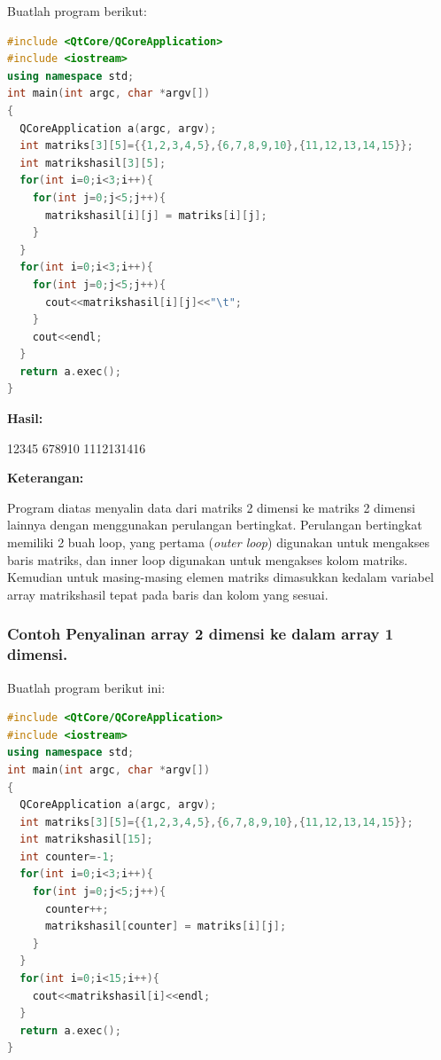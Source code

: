 Buatlah program berikut:

\begin{lstlisting}[language=c++, caption=Penyalinan Array 2 Dimensi ke Array 2 Dimensi lainnya, label=contoh3-11]
#include <QtCore/QCoreApplication>
#include <iostream>
using namespace std;
int main(int argc, char *argv[])
{
  QCoreApplication a(argc, argv);
  int matriks[3][5]={{1,2,3,4,5},{6,7,8,9,10},{11,12,13,14,15}};
  int matrikshasil[3][5];
  for(int i=0;i<3;i++){
    for(int j=0;j<5;j++){
      matrikshasil[i][j] = matriks[i][j];
    }
  }
  for(int i=0;i<3;i++){
    for(int j=0;j<5;j++){
      cout<<matrikshasil[i][j]<<"\t";
    }
    cout<<endl;
  }
  return a.exec();
}
\end{lstlisting}

\textbf{Hasil:}

\begin{lcverbatim}
12345
678910
1112131416
\end{lcverbatim}

\textbf{Keterangan:}

Program diatas menyalin data dari matriks 2 dimensi ke matriks 2 dimensi
lainnya dengan menggunakan perulangan bertingkat. Perulangan bertingkat
memiliki 2 buah loop, yang pertama (\emph{outer loop}) digunakan untuk
mengakses baris matriks, dan inner loop digunakan untuk mengakses kolom
matriks. Kemudian untuk masing-masing elemen matriks dimasukkan kedalam
variabel array matrikshasil tepat pada baris dan kolom yang sesuai.

\subsubsection*{Contoh  Penyalinan array 2 dimensi ke dalam array 1 dimensi.}

Buatlah program berikut ini:

\begin{lstlisting}[language=c++, caption=Penyalinan array 2 dimensi ke dalam array 1 dimensi, label=contoh3-12]
#include <QtCore/QCoreApplication>
#include <iostream>
using namespace std;
int main(int argc, char *argv[])
{
  QCoreApplication a(argc, argv);
  int matriks[3][5]={{1,2,3,4,5},{6,7,8,9,10},{11,12,13,14,15}};
  int matrikshasil[15];
  int counter=-1;
  for(int i=0;i<3;i++){
    for(int j=0;j<5;j++){
      counter++;
      matrikshasil[counter] = matriks[i][j];
    }
  }
  for(int i=0;i<15;i++){
    cout<<matrikshasil[i]<<endl;
  }
  return a.exec();
}
\end{lstlisting}

